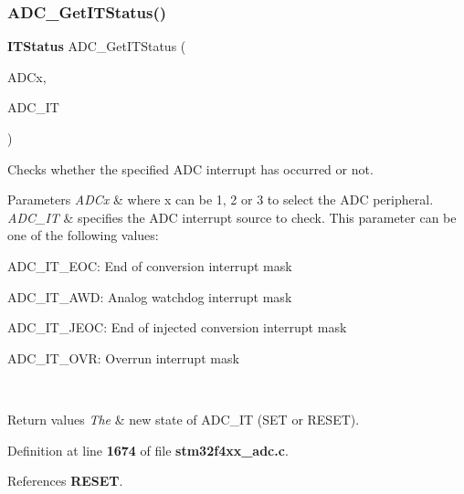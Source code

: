 \subsubsection{A\+D\+C\+\_\+\+Get\+I\+T\+Status()}
{\footnotesize\ttfamily \textbf{ I\+T\+Status} A\+D\+C\+\_\+\+Get\+I\+T\+Status (\begin{DoxyParamCaption}\item[{\textbf{ A\+D\+C\+\_\+\+Type\+Def} $\ast$}]{A\+D\+Cx,  }\item[{uint16\+\_\+t}]{A\+D\+C\+\_\+\+IT }\end{DoxyParamCaption})}



Checks whether the specified A\+DC interrupt has occurred or not. 


\begin{DoxyParams}{Parameters}
{\em A\+D\+Cx} & where x can be 1, 2 or 3 to select the A\+DC peripheral. \\
\hline
{\em A\+D\+C\+\_\+\+IT} & specifies the A\+DC interrupt source to check. This parameter can be one of the following values\+: \begin{DoxyItemize}
\item A\+D\+C\+\_\+\+I\+T\+\_\+\+E\+OC\+: End of conversion interrupt mask \item A\+D\+C\+\_\+\+I\+T\+\_\+\+A\+WD\+: Analog watchdog interrupt mask \item A\+D\+C\+\_\+\+I\+T\+\_\+\+J\+E\+OC\+: End of injected conversion interrupt mask \item A\+D\+C\+\_\+\+I\+T\+\_\+\+O\+VR\+: Overrun interrupt mask \end{DoxyItemize}
\\
\hline
\end{DoxyParams}

\begin{DoxyRetVals}{Return values}
{\em The} & new state of A\+D\+C\+\_\+\+IT (S\+ET or R\+E\+S\+ET). \\
\hline
\end{DoxyRetVals}


Definition at line \textbf{ 1674} of file \textbf{ stm32f4xx\+\_\+adc.\+c}.



References \textbf{ R\+E\+S\+ET}.


